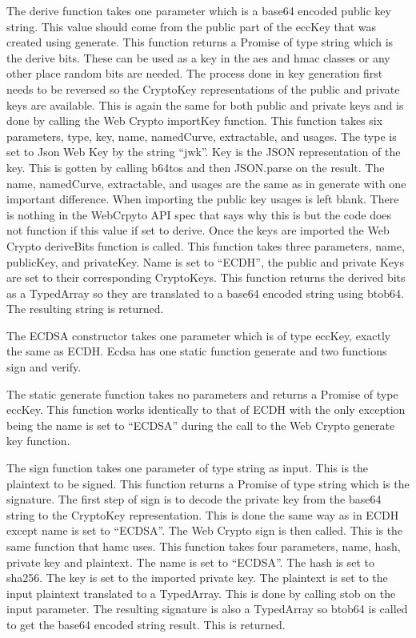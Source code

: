 The derive function takes one parameter which is a base64 encoded public key string. This value should come from the public part of the eccKey that was created using generate. This function returns a Promise of type string which is the derive bits. These can be used as a key in the aes and hmac classes or any other place random bits are needed. The process done in key generation first needs to be reversed so the CryptoKey representations of the public and private keys are available. This is again the same for both public and private keys and is done by calling the Web Crypto importKey function. This function takes six parameters, type, key, name, namedCurve, extractable, and usages. The type is set to Json Web Key by the string “jwk”. Key is the JSON representation of the key. This is gotten by calling b64tos and then JSON.parse on the result. The name, namedCurve, extractable, and usages are the same as in generate with one important difference. When importing the public key usages is left blank. There is nothing in the WebCrpyto API spec that says why this is but the code does not function if this value if set to derive. Once the keys are imported the Web Crypto deriveBits function is called. This function takes three parameters, name, publicKey, and privateKey. Name is set to “ECDH”, the public and private Keys are set to their corresponding CryptoKeys. This function returns the derived bits as a TypedArray so they are translated to a base64 encoded string using btob64. The resulting string is returned.


The ECDSA constructor takes one parameter which is of type eccKey, exactly the same as ECDH. Ecdsa has one static function generate and two functions sign and verify.


The static generate function takes no parameters and returns a Promise of type eccKey. This function works identically to that of ECDH with the only exception being the name is set to “ECDSA” during the call to the Web Crypto generate key function.


The sign function takes one parameter of type string as input. This is the plaintext to be signed. This function returns a Promise of type string which is the signature. The first step of sign is to decode the private key from the base64 string to the CryptoKey representation. This is done the same way as in ECDH except name is set to “ECDSA”. The Web Crypto sign is then called. This is the same function that hamc uses. This function takes four parameters, name, hash, private key and plaintext. The name is set to “ECDSA”. The hash is set to sha256. The key is set to the imported private key. The plaintext is set to the input plaintext translated to a TypedArray. This is done by calling stob on the input parameter. The resulting signature is also a TypedArray so btob64 is called to get the base64 encoded string result. This is returned.


